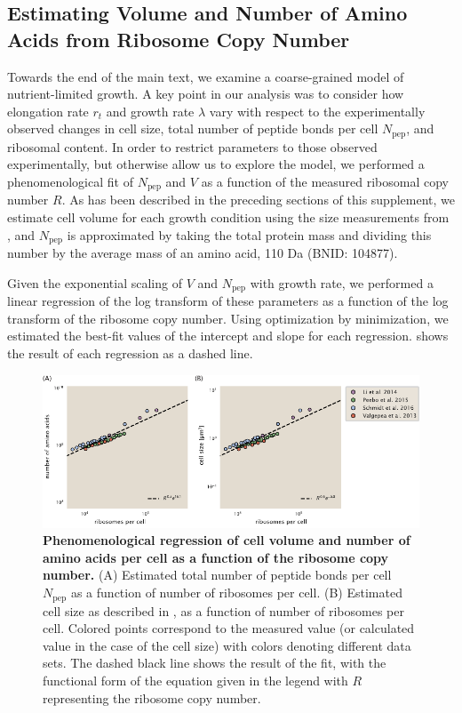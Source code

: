 \subsection{Estimating Volume and Number of Amino Acids from Ribosome Copy Number}
Towards the end of the main text, we examine a coarse-grained model of
nutrient-limited growth. A key point in our analysis was to consider  how
elongation rate $r_t$ and growth rate $\lambda$ vary with respect to the
experimentally observed changes in cell size, total number of peptide bonds per
cell  $N_\text{pep}$, and ribosomal content.  In order to restrict parameters
to those observed experimentally, but otherwise allow us to explore the
model, we performed a phenomenological fit of $N_\text{pep}$ and $V$ as a
function of the measured ribosomal copy number $R$. As has been described in the
preceding sections of this supplement, we estimate cell volume for each growth
condition using the size measurements from \cite{si2017,si2019}, and
$N_\text{pep}$ is approximated by taking the total protein mass and dividing
this number by the average mass of an amino acid, 110 Da (BNID: 104877).

Given the  exponential scaling of $V$ and $N_\text{pep}$ with growth rate, we
performed a linear regression of the log transform of these parameters as a
function of the log transform of the ribosome copy number. Using optimization by
minimization, we estimated the best-fit values of the intercept and slope for
each regression.  shows the result of each regression as a dashed
line.

\begin{figure}
  \centering
    \includegraphics{SI_figs/log_log_regression_naa_vol.pdf}
    \caption{{\textbf{Phenomenological regression of cell volume and number of
    amino acids per cell as a function of the ribosome copy number.}
    (A) Estimated total number of peptide bonds per
    cell $N_\text{pep}$ as a function of number of ribosomes per cell.
    (B) Estimated cell size as described in , as a function of number of ribosomes per cell. Colored
    points correspond to the measured value (or calculated value in the case of
    the cell size) with colors denoting different data sets. The dashed black
    line shows the result of the fit, with the functional form of the equation
    given in the legend with $R$ representing the ribosome copy number.}
  }
  \label{fig:naa_v_fit}
\end{figure}
